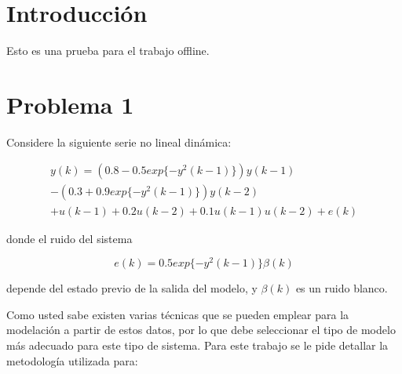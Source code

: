 \documentclass[12pt]{article}
\begin{document}

\tableofcontents

\thispagestyle{empty}
\pagebreak
\newpage
\setcounter{page}{1}


\section{Introducción}

Esto es una prueba para el trabajo offline.


\newpage
\section{Problema 1}

Considere la siguiente serie no lineal dinámica:

\begin{align}
y(k)= (0.8 - 0.5 exp\{-y^2(k- 1)\})y(k - 1)\nonumber \\
-(0.3 + 0.9 exp\{-y^2(k - 1)\})y(k - 2)\nonumber \\
+u(k - 1) + 0.2u(k - 2) + 0.1u(k - 1)u(k - 2) + e(k)
\label{e_serie}
\end{align}

donde el ruido del sistema

\begin{equation}
e(k)=  0.5 exp\{-y^2(k- 1)\}\beta(k)
\label{e_error}
\end{equation}

depende del estado previo de la salida del modelo, y $\beta(k)$ es un ruido blanco.

Como usted sabe existen varias técnicas que se pueden emplear para la modelación a partir de estos datos, por lo que debe seleccionar el tipo de modelo más adecuado para este tipo de sistema. Para este trabajo se le pide detallar la metodología utilizada para:
\end{document}
